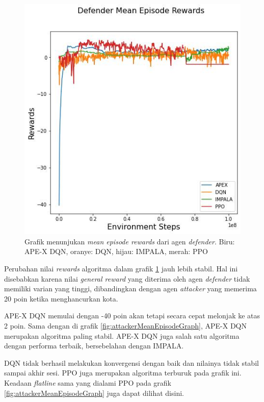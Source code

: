 \begin{figure}[H]
  \centering
    \includegraphics[scale=0.65]{gambar/defender_reward_mean.jpg}
    \caption{Grafik menunjukan \emph{mean episode rewards} dari agen \emph{defender}.
    Biru: APE-X DQN, oranye: DQN, hijau: IMPALA, merah: PPO}
    \label{fig:defenderMeanEpisodeGraph}
\end{figure}

Perubahan nilai \emph{rewards} algoritma dalam grafik \ref{fig:defenderMeanEpisodeGraph} jauh lebih stabil.
Hal ini disebabkan karena nilai \emph{general reward} yang diterima oleh agen \emph{defender} tidak memiliki varian yang tinggi,
dibandingkan dengan agen \emph{attacker} yang memerima 20 poin ketika menghancurkan kota.

APE-X DQN memulai dengan -40 poin akan tetapi secara cepat melonjak ke atas 2 poin.
Sama dengan di grafik \ref{fig:attackerMeanEpisodeGraph}, APE-X DQN merupakan algoritma paling stabil.
APE-X DQN juga salah satu algoritma dengan performa terbaik, bersebelahan dengan IMPALA.

DQN tidak berhasil melakukan konvergensi dengan baik dan nilainya tidak stabil sampai akhir sesi.
PPO juga merupakan algoritma terburuk pada grafik ini. Keadaan \emph{flatline} sama yang dialami PPO pada grafik
\ref{fig:attackerMeanEpisodeGraph} juga dapat dilihat disini.

